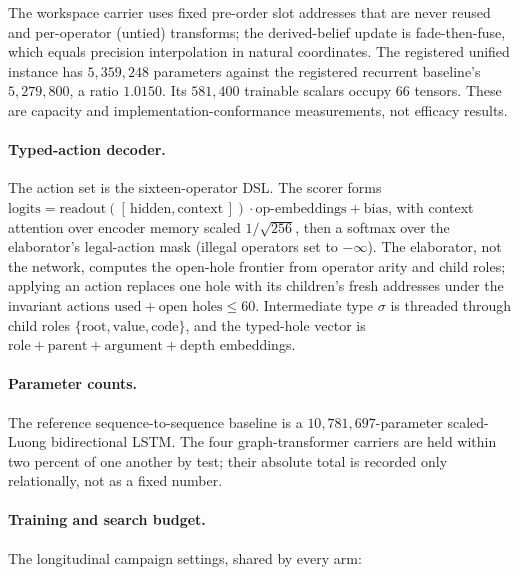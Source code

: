 \documentclass[11pt]{article}
\begin{document}
The workspace carrier uses fixed pre-order slot addresses that are never reused and
per-operator (untied) transforms; the derived-belief update is fade-then-fuse, which equals
precision interpolation in natural coordinates. The registered unified instance has
$5{,}359{,}248$ parameters against the registered recurrent baseline's $5{,}279{,}800$,
a ratio $1.0150$. Its $581{,}400$ trainable scalars occupy $66$ tensors. These are
capacity and implementation-conformance measurements, not efficacy results.

\paragraph{Typed-action decoder.} The action set is the sixteen-operator DSL. The scorer forms
$\mathrm{logits}=\mathrm{readout}([\,\text{hidden},\text{context}\,])\cdot\text{op-embeddings}+\text{bias}$,
with context attention over encoder memory scaled $1/\sqrt{256}$, then a softmax over the
elaborator's legal-action mask (illegal operators set to $-\infty$). The elaborator, not the
network, computes the open-hole frontier from operator arity and child roles; applying an
action replaces one hole with its children's fresh addresses under the invariant
$\text{actions used}+\text{open holes}\le 60$. Intermediate type $\sigma$ is threaded through
child roles $\{\text{root},\text{value},\text{code}\}$, and the typed-hole vector is
$\text{role}+\text{parent}+\text{argument}+\text{depth}$ embeddings.

\paragraph{Parameter counts.} The reference sequence-to-sequence baseline is a
$10{,}781{,}697$-parameter scaled-Luong bidirectional LSTM. The four graph-transformer
carriers are held within two percent of one another by test; their absolute total is recorded
only relationally, not as a fixed number.

\paragraph{Training and search budget.} The longitudinal campaign settings, shared by every
arm:
\end{document}
